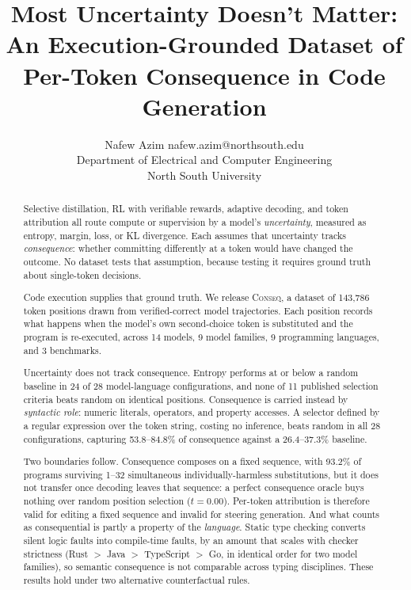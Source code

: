 \documentclass[twoside,11pt]{article}
\begin{document}
\title{Most Uncertainty Doesn't Matter:\\
An Execution-Grounded Dataset of Per-Token Consequence in Code Generation}

\author{\name Nafew Azim \email nafew.azim@northsouth.edu \\
        \addr Department of Electrical and Computer Engineering \\
        North South University}

\editor{}
\maketitle

\begin{abstract}
Selective distillation, RL with verifiable rewards, adaptive decoding, and token attribution all
route compute or supervision by a model's \emph{uncertainty}, measured as entropy, margin, loss, or
KL divergence. Each assumes that uncertainty tracks \emph{consequence}: whether committing
differently at a token would have changed the outcome. No dataset tests that assumption, because
testing it requires ground truth about single-token decisions.

Code execution supplies that ground truth. We release \textsc{Conseq}, a dataset of 143,786 token
positions drawn from verified-correct model trajectories. Each position records what happens when
the model's own second-choice token is substituted and the program is re-executed, across 14 models,
9 model families, 9 programming languages, and 3 benchmarks.

Uncertainty does not track consequence. Entropy performs at or below a random baseline in 24 of 28
model-language configurations, and none of 11 published selection criteria beats random on identical
positions. Consequence is carried instead by \emph{syntactic role}: numeric literals, operators, and
property accesses. A selector defined by a regular expression over the token string, costing no
inference, beats random in all 28 configurations, capturing 53.8--84.8\% of consequence against a
26.4--37.3\% baseline.

Two boundaries follow. Consequence composes on a fixed sequence, with 93.2\% of programs surviving
1--32 simultaneous individually-harmless substitutions, but it does not transfer once decoding
leaves that sequence: a perfect consequence oracle buys nothing over random position selection
($t = 0.00$). Per-token attribution is therefore valid for editing a fixed sequence and invalid for
steering generation. And what counts as consequential is partly a property of the \emph{language}.
Static type checking converts silent logic faults into compile-time faults, by an amount that scales
with checker strictness (Rust $>$ Java $>$ TypeScript $>$ Go, in identical order for two model
families), so semantic consequence is not comparable across typing disciplines. These results hold
under two alternative counterfactual rules.
\end{abstract}
\end{document}
